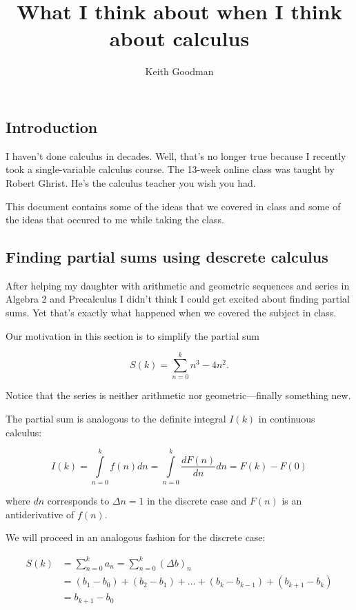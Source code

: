 \documentclass{article}
\begin{document}
\title{What I think about when I think about calculus}
\author{Keith Goodman}
\maketitle

\subsection*{Introduction}

I haven't done calculus in decades. Well, that's no longer true because I
recently took a single-variable calculus course. The 13-week online class was
taught by Robert Ghrist. He's the calculus teacher you wish you had.

This document contains some of the ideas that we covered in class and some of
the ideas that occured to me while taking the class.

\subsection*{Finding partial sums using descrete calculus}

After helping my daughter with arithmetic and geometric sequences and series in
Algebra 2 and Precalculus I didn't think I could get excited about finding
partial sums. Yet that's exactly what happened when we covered the subject in
class.

Our motivation in this section is to simplify the partial sum

\[
    S(k)=\sum\limits_{n=0}^k n^3-4n^2.
\]

\noindent Notice that the series is neither arithmetic nor geometric---finally
something new.

The partial sum is analogous to the definite integral $I(k)$ in continuous
calculus:

\[
I(k)=\int\limits_{n=0}^k f(n)dn=\int\limits_{n=0}^k\frac{dF(n)}{dn}dn=F(k)-F(0)
\]

\noindent where $dn$ corresponds to $\Delta n=1$ in the discrete case and
$F(n)$ is an antiderivative of $f(n)$.

We will proceed in an analogous fashion for the discrete case:

\begin{align*}
    S(k) &= \sum\limits_{n=0}^k a_n = \sum\limits_{n=0}^k (\Delta b)_n \\
         &= (b_1 - b_0)+(b_2 - b_1)+ \ldots + (b_k - b_{k-1}) + (b_{k+1} - b_k) \\
         &= b_{k+1} - b_0
\end{align*}
\end{document}

